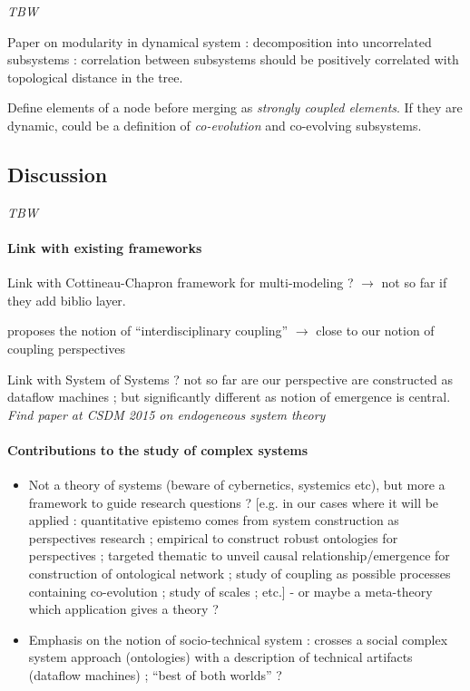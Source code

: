 \textit{TBW}

Paper on modularity in dynamical system : decomposition into uncorrelated subsystems : correlation between subsystems should be positively correlated with topological distance in the tree.

Define elements of a node before merging as \emph{strongly coupled elements}. If they are dynamic, could be a definition of \emph{co-evolution} and co-evolving subsystems.


\subsection*{Discussion}

\textit{TBW}

\paragraph{Link with existing frameworks}

Link with Cottineau-Chapron framework for multi-modeling ? $\rightarrow$ not so far if they add biblio layer.

\cite{reymond2013logique} proposes the notion of ``interdisciplinary coupling'' $\rightarrow$ close to our notion of coupling perspectives

Link with System of Systems ? not so far are our perspective are constructed as dataflow machines ; but significantly different as notion of emergence is central. \textit{Find paper at CSDM 2015 on endogeneous system theory}


\paragraph{Contributions to the study of complex systems}

\begin{itemize}
\item Not a theory of systems (beware of cybernetics, systemics etc), but more a framework to guide research questions ? [e.g. in our cases where it will be applied : quantitative epistemo comes from system construction as perspectives research ; empirical to construct robust ontologies for perspectives ; targeted thematic to unveil causal relationship/emergence for construction of ontological network ; study of coupling as possible processes containing co-evolution ; study of scales ; etc.] - or maybe a meta-theory which application gives a theory ?
\item Emphasis on the notion of socio-technical system : crosses a social complex system approach (ontologies) with a description of technical artifacts (dataflow machines) ; ``best of both worlds'' ? 
\end{itemize}








